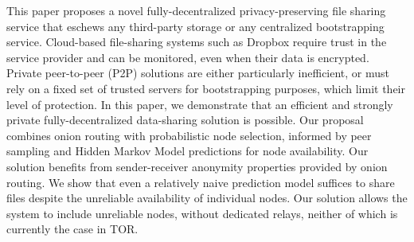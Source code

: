 %
This paper proposes a novel fully-decentralized privacy-preserving file sharing service that eschews any third-party storage or any centralized bootstrapping service.
Cloud-based file-sharing systems such as Dropbox require trust in the service provider and can be monitored, even when their data is encrypted. Private peer-to-peer (P2P) solutions are either particularly inefficient, or must rely on a fixed set of trusted servers for bootstrapping purposes, which limit their level of protection. %
In this paper, we demonstrate that an efficient and strongly private fully-decentralized data-sharing solution is possible. Our proposal combines onion routing with probabilistic node selection, informed by peer sampling and Hidden Markov Model predictions for node availability.
Our solution benefits from sender-receiver anonymity properties provided by onion routing. %
We show that even a relatively naive prediction model suffices to share files despite the unreliable availability of individual nodes. %
Our solution allows the system to include unreliable nodes, without dedicated relays, %
neither of which is currently the case in TOR.


